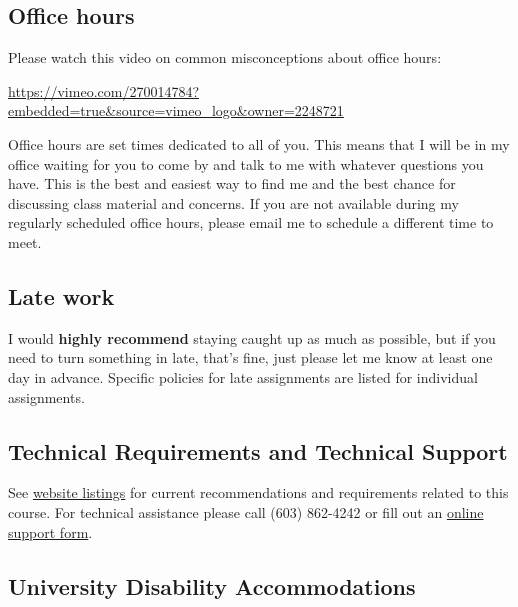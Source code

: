\documentclass[
  letterpaper,
  DIV=11,
  numbers=noendperiod]{scrreprt}
\begin{document}

\hypertarget{office-hours}{%
\subsection*{Office hours}\label{office-hours}}

Please watch this video on common misconceptions about office hours:

\url{https://vimeo.com/270014784?embedded=true\&source=vimeo_logo\&owner=2248721}

Office hours are set times dedicated to all of you. This means that I
will be in my office waiting for you to come by and talk to me with
whatever questions you have. This is the best and easiest way to find me
and the best chance for discussing class material and concerns. If you
are not available during my regularly scheduled office hours, please
email me to schedule a different time to meet.

\hypertarget{late-work}{%
\subsection*{Late work}\label{late-work}}

I would \textbf{highly recommend} staying caught up as much as possible,
but if you need to turn something in late, that's fine, just please let
me know at least one day in advance. Specific policies for late
assignments are listed for individual assignments.

\hypertarget{technical-requirements-and-technical-support}{%
\subsection*{Technical Requirements and Technical
Support}\label{technical-requirements-and-technical-support}}

See \href{https://online.unh.edu/technical-requirements}{website
listings} for current recommendations and requirements related to this
course. For technical assistance please call (603) 862-4242 or fill out
an \href{https://itsupport.unh.edu/onlinelearning/}{online support
form}.

\hypertarget{university-disability-accommodations}{%
\subsection*{University Disability
Accommodations}\label{university-disability-accommodations}}
\end{document}
